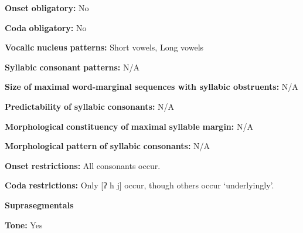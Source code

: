 \begin{styleBody}
\textbf{Onset} \textbf{obligatory:} No
\end{styleBody}

\begin{styleBody}
\textbf{Coda} \textbf{obligatory:} No
\end{styleBody}

\begin{styleBody}
\textbf{Vocalic} \textbf{nucleus} \textbf{patterns:} Short vowels, Long vowels
\end{styleBody}

\begin{styleBody}
\textbf{Syllabic} \textbf{consonant} \textbf{patterns:} N/A
\end{styleBody}

\begin{styleBody}
\textbf{Size} \textbf{of} \textbf{maximal} \textbf{word{}-marginal sequences with syllabic obstruents:} N/A
\end{styleBody}

\begin{styleBody}
\textbf{Predictability} \textbf{of} \textbf{syllabic} \textbf{consonants:} N/A
\end{styleBody}

\begin{styleBody}
\textbf{Morphological} \textbf{constituency} \textbf{of} \textbf{maximal} \textbf{syllable} \textbf{margin:} N/A
\end{styleBody}

\begin{styleBody}
\textbf{Morphological} \textbf{pattern} \textbf{of} \textbf{syllabic} \textbf{consonants:} N/A
\end{styleBody}

\begin{styleBody}
\textbf{Onset} \textbf{restrictions:} All consonants occur.
\end{styleBody}

\begin{styleBody}
\textbf{Coda} \textbf{restrictions:} Only [ʔ h j] occur, though others occur ‘underlyingly’.
\end{styleBody}

\begin{styleBody}
\textbf{Suprasegmentals}
\end{styleBody}

\begin{styleBody}
\textbf{Tone:} Yes
\end{styleBody}

